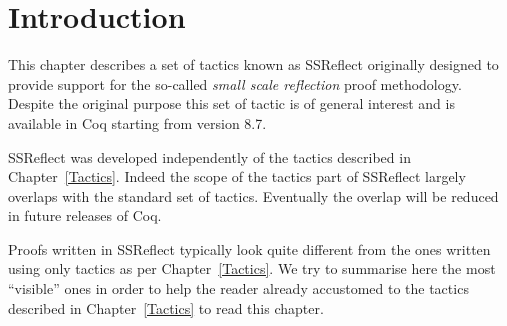 
\newcommand{\ssr}{{\sc SSReflect}}

\ifhevea\newcommand{\ssrC}[1]{\texttt{#1}}\else\newcommand{\ssrC}[1]{\text{\lstinline!#1!}}\fi
\ifhevea\renewenvironment{center}{\@open{div}{class="center"}\@open{div}{class="centered"}}{\@close{div}\@close{div}}\fi
\newcommand\ssrN[2][]{{\textsl {#2}}\ensuremath{_{#1}}}
\ifhevea\newcommand{\underbar}[1]{\underline{#1}}\fi

\let\ssrL=\lstinline

\newcommand{\iitem}{{\it i-item}}
\newcommand{\ditem}{{\it d-item}}
\newcommand{\optional}[1]{{\it[}#1{\it]}}
\newcommand{\optsep}{{\it|}}
\newcommand{\idx}[1]{\tacindex{#1 (ssreflect)}}
\newcommand{\idxC}[1]{\comindex{#1 (ssreflect)}}

\newenvironment{new}%
  {\begin{Sbox}\begin{minipage}{0.97\textwidth}%
    \begin{flushright}\textcolor{red}{\fbox{Version 1.3}}%
      \end{flushright}\noindent}%
  {\end{minipage}\end{Sbox}\noindent\doublebox{\TheSbox}}
\section{Introduction}\label{sec:intro}

This chapter describes a set of tactics known as \ssr{}
originally designed to provide support for the so-called \emph{small scale
reflection} proof methodology.  Despite the original purpose this set of tactic
is of general interest and is available in Coq starting from version 8.7.

\ssr{} was developed independently of the tactics described in
Chapter~\ref{Tactics}.  Indeed the scope of the tactics part of
\ssr{} largely overlaps with the standard set of tactics.  Eventually
the overlap will be reduced in future releases of Coq.

Proofs written in \ssr{} typically look quite different from the
ones written using only tactics as per Chapter~\ref{Tactics}.
We try to summarise here the most ``visible'' ones in order to
help the reader already accustomed to the tactics described in
Chapter~\ref{Tactics} to read this chapter.

